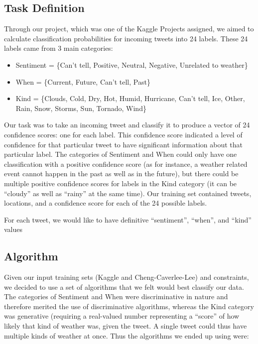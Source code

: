 \subsection{Task Definition}
	Through our project, which was one of the Kaggle Projects assigned, we aimed to calculate classification probabilities for incoming tweets into 24 labels. These 24 labels came from 3 main categories:

\begin{itemize}
\item Sentiment = \{Can’t tell, Positive, Neutral, Negative, Unrelated to weather\}
\item When = \{Current, Future, Can’t tell, Past\}
\item Kind = \{Clouds, Cold, Dry, Hot, Humid, Hurricane, Can’t tell, Ice, Other, Rain, Snow, Storms, Sun, Tornado, Wind\}
\end{itemize}

	Our task was to take an incoming tweet and classify it to produce a vector of 24 confidence scores: one for each label. This confidence score indicated a level of confidence for that particular tweet to have significant information about that particular label. The categories of Sentiment and When could only have one classification with a positive confidence score (as for instance, a weather related event cannot happen in the past as well as in the future), but there could be multiple positive confidence scores for labels in the Kind category (it can be ``cloudy'' as well as ``rainy'' at the same time). Our training set contained tweets, locations, and a confidence score for each of the 24 possible labels. 

	For each tweet, we would like to have definitive ``sentiment'', ``when'', and ``kind'' values 

\subsection{Algorithm}
	Given our input training sets (Kaggle and Cheng-Caverlee-Lee) and constraints, we decided to use a set of algorithms that we felt would best classify our data. The categories of Sentiment and When were discriminative in nature and therefore merited the use of discriminative algorithms, whereas the Kind category was generative (requiring a real-valued number representing a ``score'' of how likely that kind of weather was, given the tweet. A single tweet could thus have multiple kinds of weather at once. Thus the algorithms we ended up using were:

